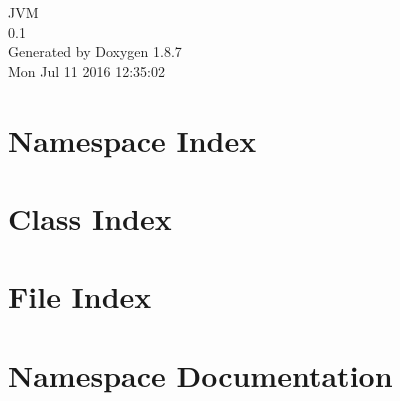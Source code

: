 \documentclass[twoside]{book}
\newcommand{\+}{\discretionary{\mbox{\scriptsize$\hookleftarrow$}}{}{}}
\newcommand{\clearemptydoublepage}{%
  \newpage{\pagestyle{empty}\cleardoublepage}%
}
\begin{document}
\hypersetup{pageanchor=false,
             bookmarks=true,
             bookmarksnumbered=true,
             pdfencoding=unicode
            }
\begin{titlepage}
\vspace*{7cm}
\begin{center}%
{\Large J\+V\+M \\[1ex]\large 0.\+1 }\\
\vspace*{1cm}
{\large Generated by Doxygen 1.8.7}\\
\vspace*{0.5cm}
{\small Mon Jul 11 2016 12:35:02}\\
\end{center}
\end{titlepage}
\clearemptydoublepage
\tableofcontents
\clearemptydoublepage
{}
\hypersetup{pageanchor=true}

\chapter{Namespace Index}

\chapter{Class Index}

\chapter{File Index}

\chapter{Namespace Documentation}

\end{document}
